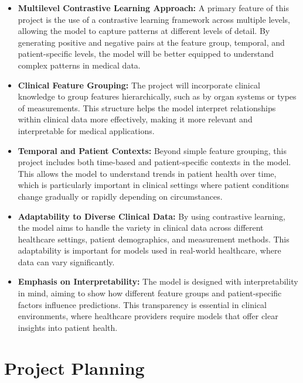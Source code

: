 \documentclass[a4paper]{article}
\begin{document}
    \begin{itemize}
        \item \textbf{Multilevel Contrastive Learning Approach:} A primary feature of this project is the use of a contrastive learning framework across multiple levels, allowing the model to capture patterns at different levels of detail. By generating positive and negative pairs at the feature group, temporal, and patient-specific levels, the model will be better equipped to understand complex patterns in medical data.
        
        \item \textbf{Clinical Feature Grouping:} The project will incorporate clinical knowledge to group features hierarchically, such as by organ systems or types of measurements. This structure helps the model interpret relationships within clinical data more effectively, making it more relevant and interpretable for medical applications.
        
        \item \textbf{Temporal and Patient Contexts:} Beyond simple feature grouping, this project includes both time-based and patient-specific contexts in the model. This allows the model to understand trends in patient health over time, which is particularly important in clinical settings where patient conditions change gradually or rapidly depending on circumstances.
        
        \item \textbf{Adaptability to Diverse Clinical Data:} By using contrastive learning, the model aims to handle the variety in clinical data across different healthcare settings, patient demographics, and measurement methods. This adaptability is important for models used in real-world healthcare, where data can vary significantly.
        
        \item \textbf{Emphasis on Interpretability:} The model is designed with interpretability in mind, aiming to show how different feature groups and patient-specific factors influence predictions. This transparency is essential in clinical environments, where healthcare providers require models that offer clear insights into patient health.
    \end{itemize}
    
    \section{Project Planning}
\end{document}

